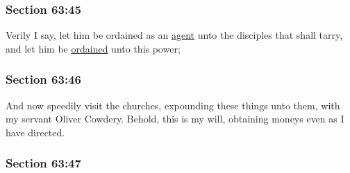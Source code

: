 
	\subsubsection{Section 63:45} %
		\label{DC63-45}

		Verily I say, let him be ordained as an \hyperref[AGENCY]{agent} unto the disciples that shall tarry, and let him be \hyperref[ORDINATION]{ordained} unto this power;


	\subsubsection{Section 63:46} %
		\label{DC63-46}

		And now speedily visit the churches, expounding these things unto them, with my servant Oliver Cowdery.  Behold, this is my will, obtaining moneys even as I have directed.


	\subsubsection{Section 63:47} %
		\label{DC63-47}

